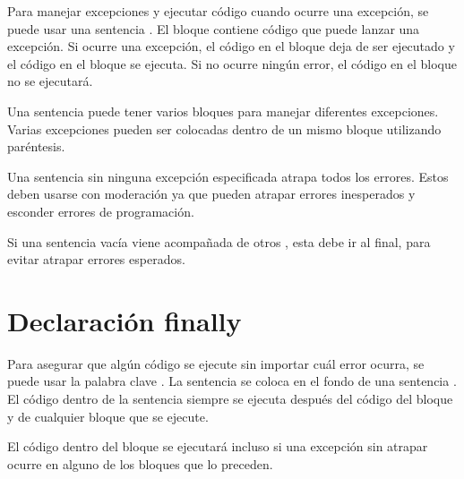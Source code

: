Para manejar excepciones y ejecutar código cuando ocurre una excepción, se puede usar una sentencia .
El bloque  contiene código que puede lanzar una excepción.
Si ocurre una excepción, el código en el bloque  deja de ser ejecutado y el código en el bloque  se ejecuta.
Si no ocurre ningún error, el código en el bloque  no se ejecutará.


Una sentencia  puede tener varios bloques  para manejar diferentes excepciones.
Varias excepciones pueden ser colocadas dentro de un mismo bloque  utilizando paréntesis.


Una sentencia  sin ninguna excepción especificada atrapa todos los errores.
Estos deben usarse con moderación ya que pueden atrapar errores inesperados y esconder errores de programación.


Si una sentencia  vacía viene acompañada de otros , esta debe ir al final, para evitar atrapar errores esperados.


\section{Declaración finally}

Para asegurar que algún código se ejecute sin importar cuál error ocurra, se puede usar la palabra clave .
La sentencia  se coloca en el fondo de una sentencia .
El código dentro de la sentencia  siempre se ejecuta después del código del bloque  y de cualquier bloque  que se ejecute.


El código dentro del bloque  se ejecutará incluso si una excepción sin atrapar ocurre en alguno de los bloques que lo preceden.

